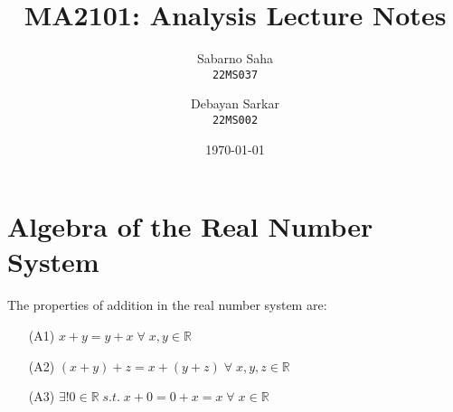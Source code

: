 \documentclass{scrartcl}
\begin{document}
\title{MA2101: Analysis Lecture Notes}
    \author{Sabarno Saha \\ \texttt{22MS037}\and Debayan Sarkar \\ \texttt{22MS002}}
    \date{\today}
    \maketitle
    \section{Algebra of the Real Number System}
    The properties of addition in the real number system are:
    \begin{enumerate}
        \item[(A1)] $x+y=y+x\; \forall \; x,y \in \mathbb{R}$
        \item[(A2)] $(x+y)+z = x+(y+z) \; \forall \; x,y,z \in \mathbb{R}$
        \item[(A3)] $ \exists !0 \in \mathbb{R} \; s.t.\; x+0 =0+x =x \; \forall \; x\in \mathbb{R}$

    \end{enumerate}
\end{document}
